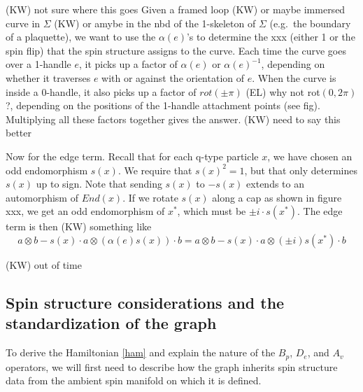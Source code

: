 \documentclass[12pt,a4paper]{article}
\newcommand\be            {\begin{equation}}
\newcommand\ee            {\end{equation}}
\newcommand{\kw}[1]{{\color{kwcolor}\footnotesize{(KW) #1}}}
\newcommand{\ethan}[1]{{\color{amethyst}\footnotesize{(EL) #1}}}
\begin{document}
\kw{not sure where this goes}
Given a framed loop \kw{or maybe immersed curve} in $\Sigma$ 
\kw{or amybe in the nbd of the 1-skeleton of $\Sigma$} (e.g.\ the boundary of a plaquette), 
we want to use the $\alpha(e)$'s
to determine the xxx (either 1 or the spin flip) that the spin structure assigns to the curve.
Each time the curve goes over a 1-handle $e$, it picks up a factor of $\alpha(e)$
or $\alpha(e)^{-1}$, depending on whether it traverses $e$ with or against the orientation of $e$.
When the curve is inside a 0-handle, it also picks up a factor
of $rot(\pm\pi)$ \ethan{why not rot$(0,2\pi)$?}, depending on the positions of the 1-handle attachment points (see fig).
Multiplying all these factors together gives the answer.
\kw{need to say this better}

Now for the edge term.
Recall that for each q-type particle $x$, we have chosen an odd endomorphism $s(x)$.
We require that $s(x)^2 = 1$, but that only determines $s(x)$ up to sign.
Note that sending $s(x)$ to $-s(x)$ extends to an automorphism of $End(x)$.
If we rotate $s(x)$ along a cap as shown in figure xxx, we get an odd endomorphism of $x^*$,
which must be $\pm i \cdot s(x^*)$.
The edge term is then \kw{something like}
\be
	a\otimes b - s(x)\cdot a \otimes (\alpha(e)s(x)) \cdot b = a\otimes b - s(x)\cdot a \otimes (\pm i) s(x^*) \cdot b
\ee


\kw{out of time}





\subsection{Spin structure considerations and the standardization of the graph} \label{standardized_handles}



To derive the Hamiltonian \eqref{ham} and explain the nature of the $B_p$, $D_e$, and $A_v$ operators, we will first need to describe how the graph inherits spin structure data from the ambient spin manifold on which it is defined. 
\end{document}
